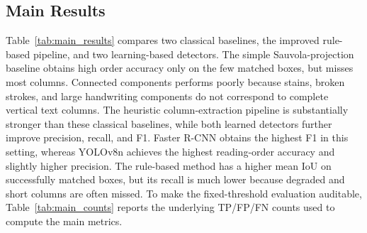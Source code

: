 \documentclass[12pt]{article}
\begin{document}
\subsection{Main Results}
\begin{table}[t]
\centering
\caption{Unified test-set comparison under IoU@0.5 matching. RO Acc. denotes reading-order accuracy.}
\label{tab:main_results}
\end{table}

Table~\ref{tab:main_results} compares two classical baselines, the improved rule-based pipeline, and two learning-based detectors. The simple Sauvola-projection baseline obtains high order accuracy only on the few matched boxes, but misses most columns. Connected components performs poorly because stains, broken strokes, and large handwriting components do not correspond to complete vertical text columns. The heuristic column-extraction pipeline is substantially stronger than these classical baselines, while both learned detectors further improve precision, recall, and F1. Faster R-CNN obtains the highest F1 in this setting, whereas YOLOv8n achieves the highest reading-order accuracy and slightly higher precision. The rule-based method has a higher mean IoU on successfully matched boxes, but its recall is much lower because degraded and short columns are often missed. To make the fixed-threshold evaluation auditable, Table~\ref{tab:main_counts} reports the underlying TP/FP/FN counts used to compute the main metrics.
\end{document}
